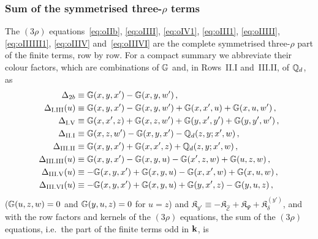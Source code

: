 \subsubsection*{Sum of the symmetrised three-\texorpdfstring{$\rho$}{rho} terms}
\noindent The $(3\rho)$ equations~\eqref{eq:oIIb}, \eqref{eq:oIIII}, \eqref{eq:oIV1}, \eqref{eq:oIII1}, \eqref{eq:oIIIII}, \eqref{eq:oIIIIII1}, \eqref{eq:oIIIV} and~\eqref{eq:oIIIVI} are the complete symmetrised three-$\rho$ part of the finite terms, row by row. For a compact summary we abbreviate their colour factors, which are combinations of $\mathbb{G}$ and, in Rows~II.I and~III.II, of $\mathbb{Q}_d$, as
\begin{align}\label{eq:Deltas}
\Delta_{2b}&\equiv\mathbb{G}(x,y,x')-\mathbb{G}(x,y,w')\,,\notag\\
\Delta_{\rm I.III}(u)&\equiv\mathbb{G}(x,y,x')-\mathbb{G}(x,y,w')+\mathbb{G}(x,x',u)+\mathbb{G}(x,u,w')\,,\notag\\
\Delta_{\rm I.V}&\equiv\mathbb{G}(x,x',z)+\mathbb{G}(x,z,w')+\mathbb{G}(y,x',y')+\mathbb{G}(y,y',w')\,,\notag\\
\Delta_{\rm II.I}&\equiv\mathbb{G}(x,z,w')-\mathbb{G}(x,y,x')-\mathbb{Q}_d(z,y;x',w)\,,\notag\\
\Delta_{\rm III.II}&\equiv\mathbb{G}(x,y,x')+\mathbb{G}(x,x',z)+\mathbb{Q}_d(z,y;x',w)\,,\notag\\
\Delta_{\rm III.III}(u)&\equiv\mathbb{G}(x,y,x')-\mathbb{G}(x,y,u)-\mathbb{G}(x',z,w)+\mathbb{G}(u,z,w)\,,\notag\\
\Delta_{\rm III.V}(u)&\equiv-\mathbb{G}(x,y,x')+\mathbb{G}(x,y,u)-\mathbb{G}(x,x',w)+\mathbb{G}(x,u,w)\,,\notag\\
\Delta_{\rm III.VI}(u)&\equiv-\mathbb{G}(x,y,x')+\mathbb{G}(x,y,u)+\mathbb{G}(y,x',z)-\mathbb{G}(y,u,z)\,,
\end{align}
($\mathbb{G}(u,z,w)=0$ and $\mathbb{G}(y,u,z)=0$ for $u=z$) and $\mathfrak K_{y'}\equiv-\mathfrak K_{\widehat{\mathcal E}}+\mathfrak K_\Psi+\mathfrak K^{(y')}_\delta$, and with the row factors and kernels of the $(3\rho)$ equations, the sum of the $(3\rho)$ equations, i.e.\ the part of the finite terms odd in $\mathbf{k}$, is
